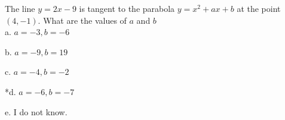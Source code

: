 
The line \( y = 2x - 9 \) is tangent to the
parabola \( y = x^{2} + ax + b \) at the point \( (4,-1) \). What are the values
of \( a \) and \( b \)\\

a. \( a = - 3, b = - 6 \)

b. \( a = - 9, b = 19 \)

c. \( a = - 4, b = - 2 \)

*d. \( a = - 6, b = - 7 \)

e. I do not know.\\
